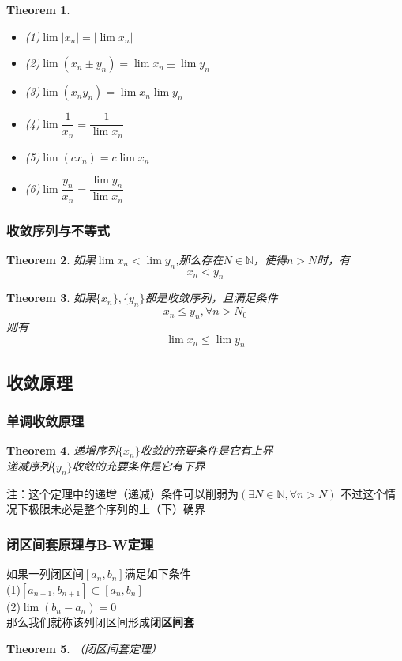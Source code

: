 \documentclass[11pt,hyperref,a4paper,UTF8]{ctexart}
\newtheorem{theorem}{Theorem}[subsection]
\begin{document}
\begin{CJK}{UTF8}{gkai}
\begin{theorem}
  \begin{itemize}
    \item (1)$\lim |x_n|=|\lim x_n|$
    \item (2)$\lim(x_n\pm y_n)=\lim x_n \pm \lim y_n$
    \item (3)$\lim(x_n y_n)=\lim x_n  \lim y_n$
    \item (4)$\lim\dfrac{1}{x_n}=\dfrac{1}{\lim x_n}$
    \item (5)$\lim(c x_n)=c\lim x_n$
    \item (6)$\lim\dfrac{y_n}{x_n}=\dfrac{\lim y_n}{\lim x_n}$
  \end{itemize}

\end{theorem}
\subsubsection{收敛序列与不等式}
\begin{theorem}

如果$\lim x_n <\lim y_n$,那么存在$N\in \mathbb{N}$，使得$n > N$时，有\\
\[x_n < y_n\]
\end{theorem}

\begin{theorem}
如果$\{x_n\},\{y_n\}$都是收敛序列，且满足条件
\[x_n \leq y_n ,\forall n > N_0\]
则有
\[\lim x_n \leq \lim y_n\]
\end{theorem}
\subsection{收敛原理}
\subsubsection{单调收敛原理}
\begin{theorem}
递增序列$\{x_n\}$收敛的充要条件是它有上界\\

递减序列$\{y_n\}$收敛的充要条件是它有下界\\
\end{theorem}
注：这个定理中的递增（递减）条件可以削弱为$(\exists N\in \mathbb{N},\forall n > N)$
不过这个情况下极限未必是整个序列的上（下）确界\\
\subsubsection{闭区间套原理与B-W定理}
如果一列闭区间$[a_n,b_n]$满足如下条件\\
(1)$[ a_{n+1},b_{n+1}]\subset[ a_n,b_n]$\\
(2)$\lim(b_n-a_n)=0$\\
那么我们就称该列闭区间形成\textbf{闭区间套}\\
\begin{theorem}（闭区间套定理）\\


\end{theorem}
\end{CJK}
\end{document}
